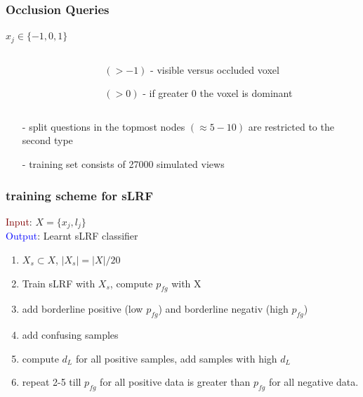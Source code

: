\documentclass[xcolor=dvipsnames]{beamer}
\begin{document}
\begin{frame}
	\frametitle{Occlusion Queries}
	\Large
	\begin{center}
		$x_j \in \{-1, 0, 1\}$
	\end{center}
	\begin{columns}
		\begin{column}{.3\textwidth}
		\end{column}
		\begin{column}{.7\textwidth}
			\begin{itemize}
				\item[$(> -1)$ - ] visible versus occluded voxel
				\item[$(>  0)$ - ] if greater $0$ the voxel is dominant
			\end{itemize}
		\end{column}
	\end{columns}
	
	\vspace{.5cm}
	\begin{itemize}
		\item[-] split questions in the topmost nodes $(\approx 5 - 10)$ are restricted to the second type
		\item[-] training set consists of 27000 simulated views
	\end{itemize}
\end{frame}

\begin{frame}
\frametitle{training scheme for sLRF}

\large

\textcolor{Maroon}{Input}: $X = \{x_j, l_j\}$ \\
\textcolor{Blue}{Output}: Learnt sLRF classifier

\begin{enumerate}
	\item $X_s \subset X$, $\lvert X_s \rvert = \lvert X \rvert / 20$
	\item Train sLRF with $X_s$, compute $p_{fg}$ with X
	\item add borderline positive (low $p_{fg}$) and borderline negativ (high $p_{fg}$)
	\item add confusing samples
	\item compute $d_L$ for all positive samples, add samples with high $d_L$
	\item repeat 2-5 till $p_{fg}$ for all positive data is greater than $p_{fg}$ for all negative data.
\end{enumerate}

\end{frame}
\end{document}
